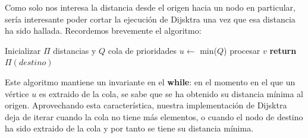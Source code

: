 Como solo nos interesa la distancia desde el origen hacia un nodo en particular, sería interesante poder cortar la ejecución de Dijsktra una vez que esa distancia ha sido hallada. Recordemos brevemente el algoritmo:

\begin{algorithm}
\begin{algorithmic}


	\State Inicializar $\Pi$ distancias y $Q$ cola de prioridades
    	\State $u \gets$ min($Q$)
        	\State procesar $v$
        \EndFor
    \EndWhile
	\State \textbf{return} $\Pi(destino)$
\EndFunction

\end{algorithmic}
\end{algorithm}

Este algoritmo mantiene un invariante en el \textbf{while}: en el momento en el que un vértice $u$ es extraido de la cola, se sabe que se ha obtenido su distancia mínima al origen. Aprovechando esta característica, nuestra implementación de Dijsktra deja de iterar cuando la cola no tiene más elementos, o cuando el nodo de destino ha sido extraido de la cola y por tanto se tiene su distancia mínima.

